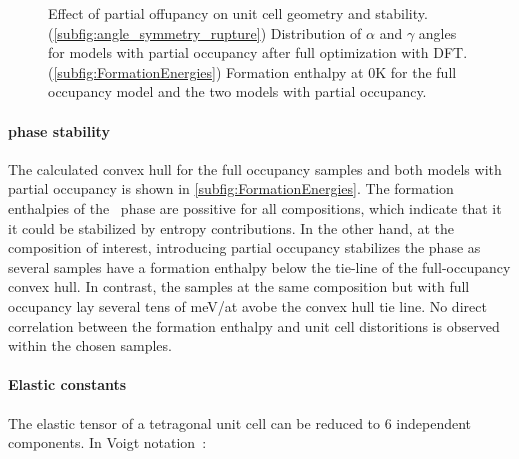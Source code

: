 \documentclass[superscriptaddress, 12pt]{revtex4-2}%
\begin{document}
\begin{figure}[H]
  \caption{
    \protect\label{fig:SymmetryConsiderations}
    Effect of partial offupancy on unit cell geometry and stability. 
    (\autoref{subfig:angle_symmetry_rupture}) Distribution of $\alpha$ and $\gamma$ angles for models with partial occupancy after full optimization with DFT. 
    (\autoref{subfig:FormationEnergies}) Formation enthalpy at 0K for the full occupancy model and the two models with partial occupancy.
    }
\end{figure}

\paragraph{phase stability}

The calculated convex hull for the full occupancy samples and both models with partial occupancy is shown in \autoref{subfig:FormationEnergies}. 
The formation enthalpies of the \textsigma~phase are possitive for all compositions, which indicate that it it could be stabilized by entropy contributions. 
In the other hand, at the composition of interest, introducing partial occupancy stabilizes the phase as several samples have a formation enthalpy below the tie-line of the full-occupancy convex hull. 
In contrast, the samples at the same composition but with full occupancy lay several tens of meV/at avobe the convex hull tie line.
No direct correlation between the formation enthalpy and unit cell distoritions is observed within the chosen samples.

\paragraph{Elastic constants}

The elastic tensor of a tetragonal unit cell can be reduced to 6 independent components.
In Voigt notation~\cite{golesorkhtabar_elastic_2013}:
\end{document}
